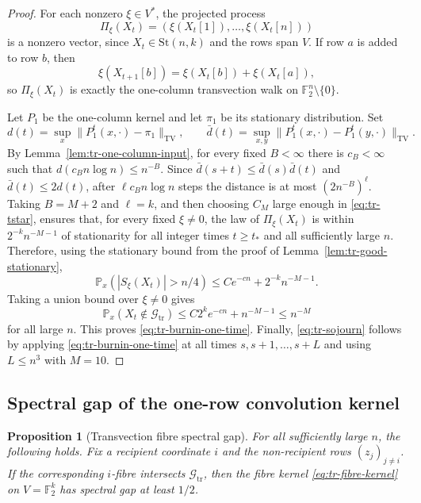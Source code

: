 \documentclass[11pt, reqno]{amsart}
\numberwithin{equation}{section}
\newtheorem{proposition}[theorem]{Proposition}
\newcommand{\Ft}{\mathbb F_2}
\newcommand{\Stief}[2]{\mathrm{St}(#1,#2)}
\newcommand{\TV}{\mathrm{TV}}
\newcommand{\Prob}{\mathbb P}
\newcommand{\Good}{\mathcal G}
\begin{document}
\begin{proof}
For each nonzero \(\xi\in V^*\), the projected process
\[
    \Pi_\xi(X_t)=(\xi(X_t[1]),\ldots,\xi(X_t[n]))
\]
is a nonzero vector, since \(X_t\in\Stief{n}{k}\) and the rows span \(V\).  If
row \(a\) is added to row \(b\), then
\[
    \xi(X_{t+1}[b])=\xi(X_t[b])+\xi(X_t[a]),
\]
so \(\Pi_\xi(X_t)\) is exactly the one-column transvection walk on
\(\Ft^n\setminus\{0\}\).

Let \(P_1\) be the one-column kernel and let \(\pi_1\) be its stationary distribution.  Set
\[
    d(t)=\sup_x\|P_1^t(x,\cdot)-\pi_1\|_{\TV},
    \qquad
    \bar d(t)=\sup_{x,y}\|P_1^t(x,\cdot)-P_1^t(y,\cdot)\|_{\TV}.
\] 
By Lemma~\ref{lem:tr-one-column-input}, for every fixed \(B<\infty\) there is
\(c_B<\infty\) such that \(d(c_Bn\log n)\le n^{-B}\).  Since
\(\bar d(s+t)\le\bar d(s)\bar d(t)\) and \(\bar d(t)\le2d(t)\), after
\(\ell c_Bn\log n\) steps the distance is at most \((2n^{-B})^\ell\).  Taking
\(B=M+2\) and \(\ell=k\), and then choosing \(C_M\) large enough in
\eqref{eq:tr-tstar}, ensures that, for every fixed \(\xi\ne0\), the law of
\(\Pi_\xi(X_t)\) is within \(2^{-k}n^{-M-1}\) of stationarity for all integer
times \(t\ge t_*\) and all sufficiently large \(n\).
Therefore, using the stationary bound from the proof of Lemma~\ref{lem:tr-good-stationary},
\[
    \Prob_x(|S_\xi(X_t)|>n/4)
    \le Ce^{-cn}+2^{-k}n^{-M-1}.
\]
Taking a union bound over \(\xi\ne0\) gives
\[
    \Prob_x(X_t\notin\Good_{\mathrm{tr}})
    \le C2^k e^{-cn}+n^{-M-1}
    \le n^{-M}
\]
for all large \(n\).  This proves \eqref{eq:tr-burnin-one-time}.  Finally,
\eqref{eq:tr-sojourn} follows by applying \eqref{eq:tr-burnin-one-time} at all
times \(s,s+1,\ldots,s+L\) and using \(L\le n^3\) with \(M=10\).
\end{proof}

\subsection{Spectral gap of the one-row convolution kernel}\label{subsec:transvection-fibre-gap}



\begin{proposition}[Transvection fibre spectral gap]\label{prop:tr-fibre-gap}
For all sufficiently large \(n\), the following holds.  Fix a recipient
coordinate \(i\) and the non-recipient rows \((z_j)_{j\ne i}\).  If the corresponding
\(i\)-fibre intersects \(\Good_{\mathrm{tr}}\), then the fibre kernel
\eqref{eq:tr-fibre-kernel} on \(V=\Ft^k\) has spectral gap at least \(1/2\).
\end{proposition}
\end{document}
